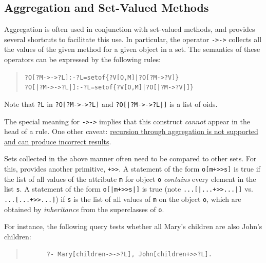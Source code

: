 \documentclass[11pt]{article}
\newcommand{\ERGO}{\mbox{\smaller{\ensuremath{\cal{E}}\smaller{{\sc{RGO}}}}}\xspace}
\newcommand{\FLSYSTEM}{\ERGO}
\begin{document}
\subsection {Aggregation and Set-Valued Methods}

\index{{\tt ->->}}
Aggregation is often used in conjunction with set-valued methods, and
\FLSYSTEM provides several shortcuts to facilitate this use.
In particular, the operator {\tt ->->} 
collects all the values of the given
method for a given object in a set. The semantics of these operators can be
expressed by the following rules:

\begin{quote}
\begin{alltt}
?O[?M->->?L] :- ?L=setof\{?V[O,M]|?O[?M->?V]\} \vspace{2mm}
?O[|?M->->?L|] :- ?L=setof\{?V[O,M]|?O[|?M->?V|]\}
\end{alltt}
\end{quote}

\noindent
Note that \texttt{?L}  in {\tt ?O[?M->->?L]}  and {\tt ?O[|?M->->?L|]} is a list of oids.

The special meaning for {\tt ->->} implies that this
construct \emph{cannot} appear in the head of a rule.
One other caveat: \underline{recursion through aggregation is not supported and can
produce incorrect results}.



\index{\tt +>{}>}
Sets collected in the above manner often  need to be compared to other
sets. For this, \FLSYSTEM provides another primitive, {\tt +>{}>}.
A statement of the form {\tt o[m+>{}>s]} is true if the list of all values of the
attribute {\tt m} for object {\tt o} \emph{contains} every
element in the list {\tt s}.  
A statement of the form \texttt{o[|m+>{}>s|]}  is true (note 
\texttt{...[|...+>{}>...|]}   vs. \texttt{...[...+>{}>...]})
if \texttt{s} is the
list of all values of \texttt{m} on the object \texttt{o}, which are
obtained by \emph{inheritance} from the superclasses of \texttt{o}.   

For instance, the following query tests whether all Mary's children are
also John's children:
\begin{quote}
\begin{verbatim}
      ?- Mary[children->->?L], John[children+>>?L].
\end{verbatim}
\end{quote}
\end{document}
